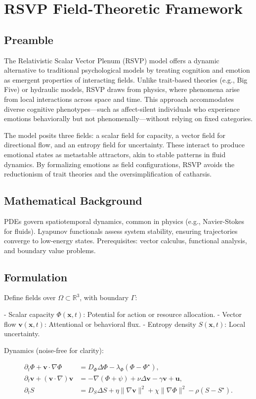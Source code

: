 \documentclass[11pt]{article}
\theoremstyle{plain}
\begin{document}
\section{RSVP Field-Theoretic Framework}

\subsection{Preamble}
The Relativistic Scalar Vector Plenum (RSVP) model offers a dynamic alternative to traditional psychological models by treating cognition and emotion as emergent properties of interacting fields. Unlike trait-based theories (e.g., Big Five) or hydraulic models, RSVP draws from physics, where phenomena arise from local interactions across space and time. This approach accommodates diverse cognitive phenotypes—such as affect-silent individuals who experience emotions behaviorally but not phenomenally—without relying on fixed categories.

The model posits three fields: a scalar field for capacity, a vector field for directional flow, and an entropy field for uncertainty. These interact to produce emotional states as metastable attractors, akin to stable patterns in fluid dynamics. By formalizing emotions as field configurations, RSVP avoids the reductionism of trait theories and the oversimplification of catharsis.

\subsection{Mathematical Background}
PDEs govern spatiotemporal dynamics, common in physics (e.g., Navier-Stokes for fluids). Lyapunov functionals assess system stability, ensuring trajectories converge to low-energy states. Prerequisites: vector calculus, functional analysis, and boundary value problems.

\subsection{Formulation}
Define fields over \(\Omega \subset \mathbb{R}^3\), with boundary \(\Gamma\):

- Scalar capacity \(\Phi(\mathbf{x}, t)\): Potential for action or resource allocation.
- Vector flow \(\mathbf{v}(\mathbf{x}, t)\): Attentional or behavioral flux.
- Entropy density \(S(\mathbf{x}, t)\): Local uncertainty.

Dynamics (noise-free for clarity):

\begin{align}
\partial_t \Phi + \mathbf{v} \cdot \nabla \Phi &= D_\Phi \Delta \Phi - \lambda_\Phi (\Phi - \Phi^\star), \label{eq:phi} \\
\partial_t \mathbf{v} + (\mathbf{v} \cdot \nabla) \mathbf{v} &= -\nabla (\Phi + \psi) + \nu \Delta \mathbf{v} - \gamma \mathbf{v} + \mathbf{u}, \label{eq:v} \\
\partial_t S &= D_S \Delta S + \eta \|\nabla \mathbf{v}\|^2 + \chi \|\nabla \Phi\|^2 - \rho (S - S^\star). \label{eq:s}
\end{align}
\end{document}

